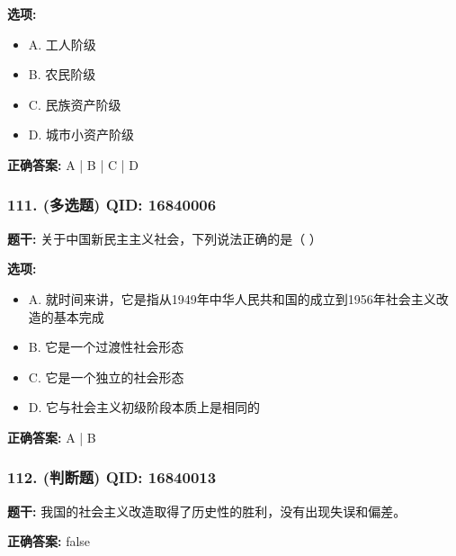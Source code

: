 \documentclass[12pt,UTF8]{ctexart}
\begin{document}
\textbf{选项:}
\begin{itemize}[leftmargin=*]

  \item A. 工人阶级

  \item B. 农民阶级

  \item C. 民族资产阶级

  \item D. 城市小资产阶级

\end{itemize}

\textbf{正确答案:}
A | B | C | D

\vspace{0.3em}\hrulefill\vspace{0.7em}

\subsubsection*{111. (多选题) \small QID: 16840006}

\textbf{题干:}
关于中国新民主主义社会，下列说法正确的是（ ）

\textbf{选项:}
\begin{itemize}[leftmargin=*]

  \item A. 就时间来讲，它是指从1949年中华人民共和国的成立到1956年社会主义改造的基本完成

  \item B. 它是一个过渡性社会形态

  \item C. 它是一个独立的社会形态

  \item D. 它与社会主义初级阶段本质上是相同的

\end{itemize}

\textbf{正确答案:}
A | B

\vspace{0.3em}\hrulefill\vspace{0.7em}

\subsubsection*{112. (判断题) \small QID: 16840013}

\textbf{题干:}
我国的社会主义改造取得了历史性的胜利，没有出现失误和偏差。

\textbf{正确答案:}
false
\end{document}
